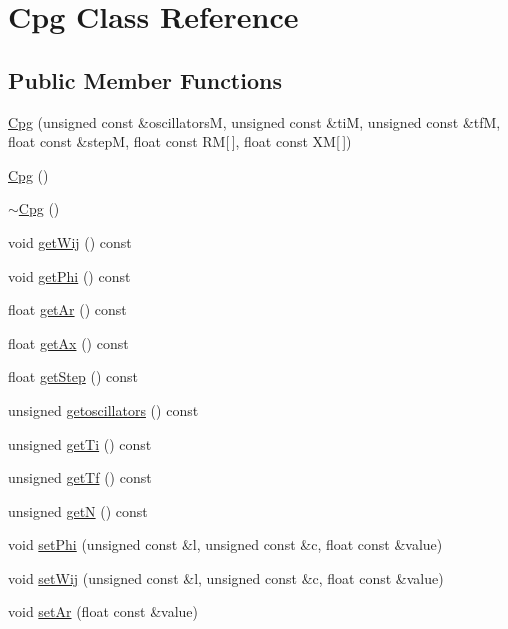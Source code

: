 \hypertarget{classCpg}{}\section{Cpg Class Reference}
\label{classCpg}
\subsection*{Public Member Functions}
\begin{DoxyCompactItemize}
\item 
\hyperlink{classCpg_aa4f2d1746f254898df3343de7827994c}{Cpg} (unsigned const \&oscillatorsM, unsigned const \&tiM, unsigned const \&tfM, float const \&stepM, float const RM\mbox{[}$\,$\mbox{]}, float const XM\mbox{[}$\,$\mbox{]})
\item 
\hyperlink{classCpg_a63ca031bf2884942657658668fc10afa}{Cpg} ()
\item 
\hyperlink{classCpg_a35060a1599a9ef8b8e1d693d6ccc57b5}{$\sim$\+Cpg} ()
\item 
void \hyperlink{classCpg_a35bdba315defd8c291c4c9cc03a170de}{get\+Wij} () const 
\item 
void \hyperlink{classCpg_ad95a497c054cb1b590d11c37ac5e4587}{get\+Phi} () const 
\item 
float \hyperlink{classCpg_ae1dabd4cdf93e6b33194c8a72684cb4c}{get\+Ar} () const 
\item 
float \hyperlink{classCpg_a47946da3dd0c6bfb4f893b229aae6f4a}{get\+Ax} () const 
\item 
float \hyperlink{classCpg_a0a9ac8b5a332b4aed76fbd72366568e2}{get\+Step} () const 
\item 
unsigned \hyperlink{classCpg_aa49b5de07bb98b1532e0260c6d8c1e74}{getoscillators} () const 
\item 
unsigned \hyperlink{classCpg_a63d0ff3b0257b961f3eb7b0ca1c6b737}{get\+Ti} () const 
\item 
unsigned \hyperlink{classCpg_a40c6404103f6cb39f29242bab0aa5df4}{get\+Tf} () const 
\item 
unsigned \hyperlink{classCpg_a6d507c49072684060bc8250f3b2138db}{getN} () const 
\item 
void \hyperlink{classCpg_a0f5050bebc6051e40de3c4ac5dd1932a}{set\+Phi} (unsigned const \&l, unsigned const \&c, float const \&value)
\item 
void \hyperlink{classCpg_a2c2651f04fa5d819fa5e7bebc42047e6}{set\+Wij} (unsigned const \&l, unsigned const \&c, float const \&value)
\item 
void \hyperlink{classCpg_a80c39262bf404f7137b159ad49e1b54f}{set\+Ar} (float const \&value)

\end{DoxyCompactItemize}
